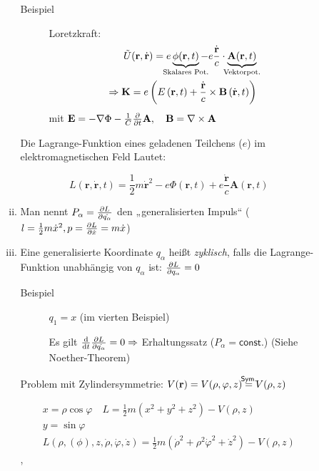 \begin{enumerate}
\begin{description}
\begin{enumerate}[i)]
  \begin{description}
  \item[Beispiel] Loretzkraft:
    \begin{align*}
      \tilde{U}(\textbf{r},\dot{\textbf{r}})
      = e \underbrace{\phi(\textbf{r},t)}_{\mathclap{\text{Skalares Pot.}}} - e
      \frac{\dot{\textbf{r}}}{c} \cdot
      \underbrace{\textbf{A}(\textbf{r},t)}_{\mathclap{\text{Vektorpot.}}} \\
      \Rightarrow \textbf{K} = e \left( E \left( \textbf{r}, t\right)
      + \frac{\dot{\textbf{r}}}{c} \times \textbf{B} \left( \dot{\textbf{r}}, t \right)
      \right)
    \end{align*}
    mit $\textbf{E} = - \nabla \Phi - \frac{1}{C} \frac{\partial }{\partial t} \textbf{A},
    \quad \textbf{B} = \nabla \times \textbf{A}$
  \end{description}

  Die Lagrange-Funktion eines geladenen Teilchens ($e$) im
  elektromagnetischen Feld Lautet:

  \begin{equation*}
    L(\mathbf{r}, \dot{\mathbf{r}}, t) = \frac{1}{2} m \dot{\mathbf{r}}^2
    - e \Phi(\mathbf{r}, t) + e \frac{\dot{\mathbf{r}}}{c} \mathbf{A}(\mathbf{r}, t)
  \end{equation*}

\item Man nennt $P_{\alpha} = \frac{\partial L}{\partial \dot{q_{\alpha}}}$ den
  „generalisierten Impuls“
  ($ l = \frac{1}{2} m \dot{x}^2, p = \frac{\partial L}{\partial \dot{x}} = m\dot{x}$)

\item Eine generalisierte Koordinate $q_{\alpha}$ heißt
  \emph{zyklisch}, falls die Lagrange-Funktion unabhängig von
  $q_{\alpha}$ ist: $\frac{\partial L}{\partial q_{\alpha}} = 0$

  \begin{description}
  \item[Beispiel] $q_1 = x$ (im vierten Beispiel)

    Es gilt $ \frac{\text{d} }{\text{d} t} \frac{\partial L}{\partial \dot{q_{\alpha}}} = 0 \Rightarrow $
    Erhaltungssatz ($P_{\alpha} = \mathsf{const.}$) (Siehe
    Noether-Theorem)
  \end{description}

Problem mit Zylindersymmetrie:
  $V(\mathbf{r}) = V(\rho, \varphi, z)
  \stackrel{\mathclap{\mathsf{Sym.}}}{=} V(\rho,z)$

\begin{align*}
  x = \rho \cos \varphi \quad
  L = \frac{1}{2} m \left( x^2+y^2+z^2 \right) - V \left( \rho, z \right) \\
  y = \sin \varphi \\
  L \left( \rho, (\phi), z, \dot{\rho}, \dot{\varphi}, \dot{z} \right)
  = \frac{1}{2} m \left( \dot{\rho}^2 + \rho^2 \dot{\varphi}^2 + \dot{z}^2 \right)
  - V(\rho,z)
\end{align*},


\end{enumerate}
\end{description}
\end{enumerate}
